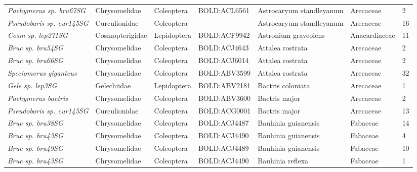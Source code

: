 \documentclass[11pt]{article}
\begin{document}
\begin{landscape}
\begin{longtable}{@{}lllllll@{}}
\textit{Pachymerus sp. bru67SG}                       & Chrysomelidae   & Coleoptera   & BOLD:ACL6561 & Astrocaryum standleyanum           & Arecaceae        & 2     \\
\textit{Pseudobaris sp. cur145SG}                     & Curculionidae   & Coleoptera   &              & Astrocaryum standleyanum           & Arecaceae        & 16    \\
\textit{Cosm sp. lep271SG}                            & Cosmopterigidae & Lepidoptera  & BOLD:ACF9942 & Astronium graveolens               & Anacardiaceae    & 11    \\
\textit{Bruc sp. bru54SG}                             & Chrysomelidae   & Coleoptera   & BOLD:ACJ4643 & Attalea rostrata                   & Arecaceae        & 2     \\
\textit{Bruc sp. bru66SG}                             & Chrysomelidae   & Coleoptera   & BOLD:ACJ6014 & Attalea rostrata                   & Arecaceae        & 2     \\
\textit{Speciomerus giganteus}                        & Chrysomelidae   & Coleoptera   & BOLD:ABV3599 & Attalea rostrata                   & Arecaceae        & 32    \\
\textit{Gele sp. lep3SG}                              & Gelechiidae     & Lepidoptera  & BOLD:ABV2181 & Bactris coloniata                  & Arecaceae        & 1     \\
\textit{Pachymerus bactris}                           & Chrysomelidae   & Coleoptera   & BOLD:ABV3600 & Bactris major                      & Arecaceae        & 2     \\
\textit{Pseudobaris sp. cur145SG}                     & Curculionidae   & Coleoptera   & BOLD:ACG0001 & Bactris major                      & Arecaceae        & 13    \\
\textit{Bruc  sp. bru38SG}                            & Chrysomelidae   & Coleoptera   & BOLD:ACJ4487 & Bauhinia guianensis                & Fabaceae         & 14    \\
\textit{Bruc sp. bru43SG}                             & Chrysomelidae   & Coleoptera   & BOLD:ACJ4490 & Bauhinia guianensis                & Fabaceae         & 4     \\
\textit{Bruc sp. bru49SG}                             & Chrysomelidae   & Coleoptera   & BOLD:ACJ4489 & Bauhinia guianensis                & Fabaceae         & 10    \\
\textit{Bruc sp. bru43SG}                             & Chrysomelidae   & Coleoptera   & BOLD:ACJ4490 & Bauhinia reflexa                   & Fabaceae         & 1     \\

\end{longtable}
\end{landscape}
\end{document}

